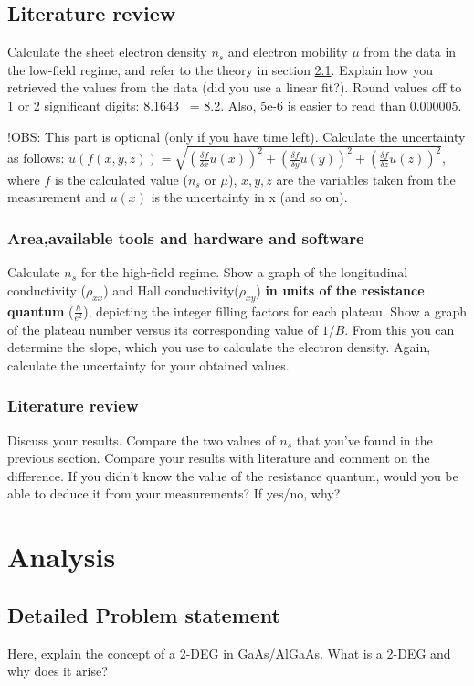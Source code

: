 \documentclass[a4paper]{report}
\begin{document}
    \section{Literature review}
    Calculate the sheet electron density $n_{s}$ and electron mobility $\mu$ from the data in the low-field regime, and refer to the theory in section \ref{sec:theory}. Explain how you retrieved the values from the data (did you use a linear fit?).
    Round values off to 1 or 2 significant digits: 8.1643 ~= 8.2. Also, 5e-6 is easier to read than 0.000005.
    
    !OBS: This part is optional (only if you have time left).
    Calculate the uncertainty as follows: \newline $u(f(x, y, z)) = \sqrt{(\frac{\delta f}{\delta{x}} u(x))^{2} + (\frac{\delta f}{\delta{y}} u(y))^{2} + (\frac{\delta f}{\delta{z}} u(z))^{2}}$, where $f$ is the calculated value ($n_{s}$ or $\mu$), $x, y, z$ are the variables taken from the measurement and $u(x)$ is the uncertainty in x (and so on).
    
    \subsection{Area,available tools and hardware and software}
    Calculate $n_{s}$ for the high-field regime.
    Show a graph of the longitudinal conductivity ($\rho_{xx}$) and Hall conductivity($\rho_{xy}$) \textbf{in units of the resistance quantum} ($\frac{h}{e^{2}}$), depicting the integer filling factors for each plateau.
    Show a graph of the plateau number versus its corresponding value of $1/B$. From this you can determine the slope, which you use to calculate the electron density.
    Again, calculate the uncertainty for your obtained values.
    
    \subsection{Literature review}
    Discuss your results. Compare the two values of $n_{s}$ that you've found in the previous section. Compare your results with literature and comment on the difference. If you didn't know the value of the resistance quantum, would you be able to deduce it from your measurements? If yes/no, why?
    
    \chapter {Analysis}
    \section{Detailed Problem statement}
    \label{sec:theory}
    Here, explain the concept of a 2-DEG in GaAs/AlGaAs. What is a 2-DEG and why does it arise?
\end{document}
